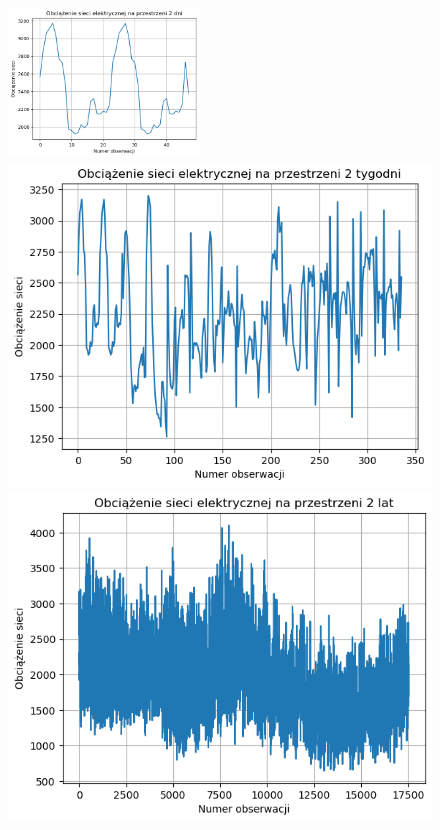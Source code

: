 \documentclass[11pt]{article}
\begin{document}
\begin{figure}[h!]
    \centering
    \includegraphics[width=0.45\textwidth]{dane_dwudniowe.png}
    
    \vspace{1cm}

    \begin{minipage}[b]{0.45\textwidth}
        \centering
        \includegraphics[width=\textwidth]{dane_dwutygodniowe.png}
    \end{minipage}
    \hfill
    \begin{minipage}[b]{0.45\textwidth}
        \centering
        \includegraphics[width=\textwidth]{dane_dwuletnie.png}

\end{minipage}
\end{figure}
\end{document}
